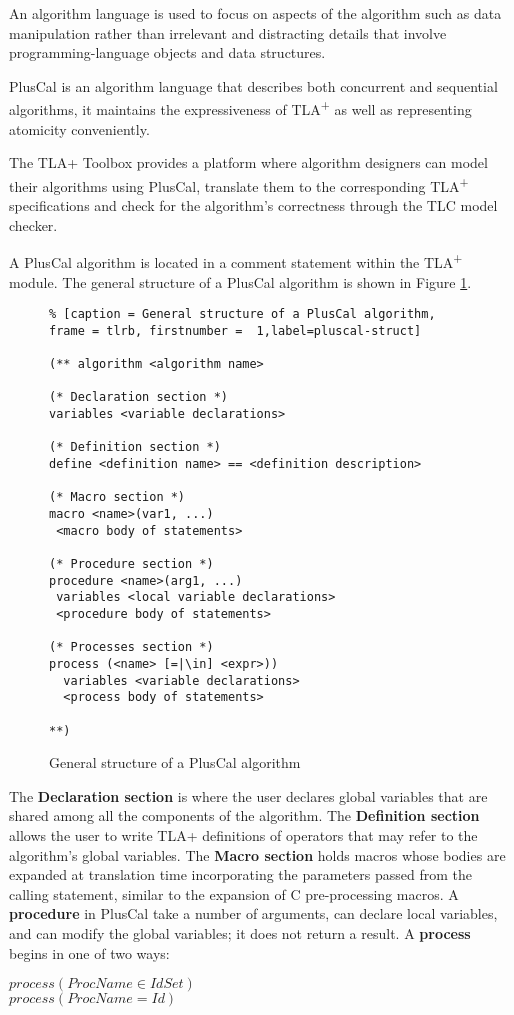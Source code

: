 \documentclass{thesul}
\newcommand{\tlaplus}{TLA\textsuperscript{+}\xspace}
\begin{document}
An algorithm language is used to focus on aspects of the algorithm such as data manipulation rather than irrelevant and distracting details that involve programming-language objects and data structures.
	
PlusCal is an algorithm language that describes both concurrent and sequential algorithms, it maintains the expressiveness of \tlaplus as well as representing atomicity conveniently.

The TLA+ Toolbox provides a platform where algorithm designers can model their algorithms using PlusCal, translate them to the corresponding \tlaplus specifications and check for the algorithm's correctness through the TLC model checker.

A PlusCal algorithm is located in a comment statement within the \tlaplus module. The general structure of a PlusCal algorithm is shown in Figure \ref{pluscal-struct}.

\begin{figure}[!h]
\begin{lstlisting}% [caption = General structure of a PlusCal algorithm, frame = tlrb, firstnumber =  1,label=pluscal-struct]

(** algorithm <algorithm name>

(* Declaration section *)
variables <variable declarations>

(* Definition section *)
define <definition name> == <definition description>

(* Macro section *)
macro <name>(var1, ...)
 <macro body of statements>

(* Procedure section *)
procedure <name>(arg1, ...)
 variables <local variable declarations>
 <procedure body of statements>

(* Processes section *)
process (<name> [=|\in] <expr>))
  variables <variable declarations>
  <process body of statements>

**)

\end{lstlisting}
\caption{General structure of a PlusCal algorithm}
\label{pluscal-struct}
\end{figure}

The \textbf{Declaration section} is where the user declares global variables that are shared among all the components of the algorithm. The \textbf{Definition section} allows the user to write TLA+ definitions of operators that may refer to the algorithm's global variables.
The \textbf{Macro section} holds macros whose bodies are expanded at translation time incorporating the parameters passed from the calling statement, similar to the expansion of C pre-processing macros. A \textbf{procedure} in PlusCal take a number of arguments, can declare local variables, and can modify the global variables; it does not return a result. A \textbf{process} begins in one of two ways: 
\begin{center}
$process (ProcName \in IdSet)$ \\
$process (ProcName = Id)$
\end{center}
\end{document}

